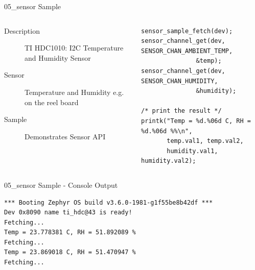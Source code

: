 \documentclass[10pt, aspectratio=169]{beamer}
\begin{document}
\begin{frame}[fragile]{05\_sensor Sample}
  \begin{columns}
    \begin{column}{0.6\textwidth}
      \begin{description}
	\item [Description] TI HDC1010: I2C Temperature and Humidity Sensor
	\item [Sensor] Temperature and Humidity e.g. on the reel board
	\item [Sample] Demonstrates Sensor API
      \end{description}
    \end{column}
    \begin{column}{0.4\textwidth}
        {\fontsize{5}{5}\selectfont
  \begin{listing}[H]
    \begin{verbatim}
sensor_sample_fetch(dev);
sensor_channel_get(dev, SENSOR_CHAN_AMBIENT_TEMP,
	           &temp);
sensor_channel_get(dev, SENSOR_CHAN_HUMIDITY,
	           &humidity);

/* print the result */
printk("Temp = %d.%06d C, RH = %d.%06d %%\n",
       temp.val1, temp.val2,
       humidity.val1, humidity.val2);
    \end{verbatim}
    \caption{\scriptsize{Excerpt from samples/05\_sensor/src/main.c}}
  \end{listing}
        }
    \end{column}
  \end{columns}
\end{frame}
\begin{frame}[fragile]{05\_sensor Sample - Console Output}
  \begin{listing}[H]
    \begin{verbatim}
*** Booting Zephyr OS build v3.6.0-1981-g1f55be8b42df ***
Dev 0x8090 name ti_hdc@43 is ready!
Fetching...
Temp = 23.778381 C, RH = 51.892089 %
Fetching...
Temp = 23.869018 C, RH = 51.470947 %
Fetching...
    \end{verbatim}
  \end{listing}
\end{frame}
\end{document}

